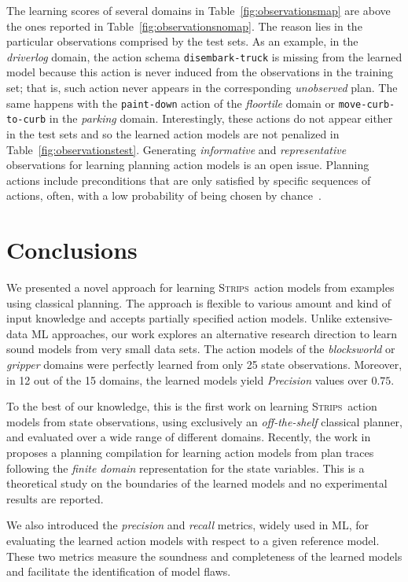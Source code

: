 \documentclass[3p,times]{elsarticle}
\newcommand{\strips}{\textsc{Strips}}     %
\begin{document}
The learning scores of several domains in Table~\ref{fig:observationsmap} are above the ones reported in Table~\ref{fig:observationsnomap}. The reason lies in the particular observations comprised by the test sets. As an example, in the {\em driverlog} domain, the action schema {\small \tt disembark-truck} is missing from the learned model because this action is never induced from the observations in the training set; that is, such action never appears in the corresponding \emph{unobserved} plan. The same happens with the {\small \tt paint-down} action of the {\em floortile} domain or {\small \tt move-curb-to-curb} in the {\em parking} domain. Interestingly, these actions do not appear either in the test sets and so the learned action models are not penalized in Table~\ref{fig:observationstest}. Generating {\em informative} and {\em representative} observations for learning planning action models is an open issue. Planning actions include preconditions that are only satisfied by specific sequences of actions, often, with a low probability of being chosen by chance~\cite{fern2004learning}.

  
\section{Conclusions}
\label{sec:Section9}
We presented a novel approach for learning \strips\ action models from examples using classical planning. The approach is flexible to various amount and kind of input knowledge and accepts partially specified action models. Unlike extensive-data ML approaches, our work explores an alternative research direction to learn sound models from very small data sets. The action models of the {\em blocksworld} or {\em gripper} domains were perfectly learned from only 25 state observations. Moreover, in 12 out of the 15 domains, the learned models yield {\em Precision} values over $0.75$.

To the best of our knowledge, this is the first work on learning \strips\ action models from state observations, using exclusively an {\em off-the-shelf} classical planner, and evaluated over a wide range of different domains. Recently, the work in~\cite{SternJ17} proposes a planning compilation for learning action models from plan traces following the {\em finite domain} representation for the state variables. This is a theoretical study on the boundaries of the learned models and no experimental results are reported.

We also introduced the {\em precision} and {\em recall} metrics, widely used in ML, for evaluating the learned action models with respect to a given reference model. These two metrics measure the soundness and completeness of the learned models and facilitate the identification of model flaws.
\end{document}
